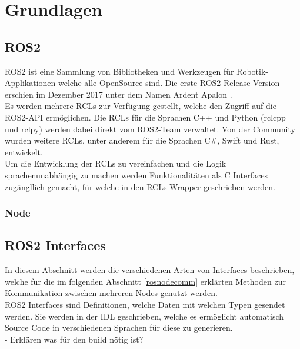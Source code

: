 \section {Grundlagen}
\subsection{ROS2}
\ac{ROS2} ist eine Sammlung von Bibliotheken und Werkzeugen für Robotik-Applikationen welche alle OpenSource sind. Die erste \ac{ROS2} Release-Version erschien im Dezember 2017 unter dem Namen Ardent Apalon \citet{ros2docs}.\\
Es werden  mehrere \acp{RCL}  zur Verfügung gestellt, welche den Zugriff auf die \ac{ROS2}-API ermöglichen. Die \acp{RCL} für die Sprachen C++ und Python (rclcpp und rclpy) werden dabei direkt vom \ac{ROS2}-Team verwaltet. Von der Community wurden weitere \acp{RCL}, unter anderem für die Sprachen C\#, Swift und Rust, entwickelt.\\
Um die Entwicklung der \acp{RCL} zu vereinfachen und die Logik sprachenunabhängig zu machen werden Funktionalitäten als C Interfaces zugängllich gemacht, für welche in den \acp{RCL} Wrapper geschrieben werden.
\subsubsection{Node}
\subsection{ROS2 Interfaces}
In diesem Abschnitt werden die verschiedenen Arten von Interfaces beschrieben, welche für die im folgenden Abschnitt \ref{rosnodecomm} erklärten Methoden zur Kommunikation zwischen mehreren Nodes genutzt werden.\\
\ac{ROS2} Interfaces sind Definitionen, welche Daten mit welchen Typen gesendet werden. Sie werden in der \ac{IDL} geschrieben, welche es ermöglicht automatisch Source Code in verschiedenen Sprachen für diese zu generieren.\\
- Erklären was für den build nötig ist?
